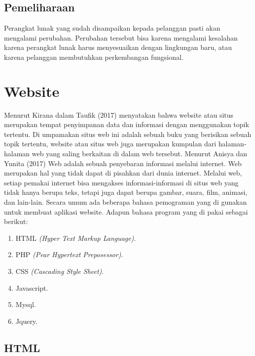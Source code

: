\subsection{ Pemeliharaan}
Perangkat lunak yang sudah disampaikan kepada pelanggan pasti akan mengalami perubahan. Perubahan tersebut bisa karena mengalami kesalahan karena perangkat lunak harus menyesuaikan dengan lingkungan baru, atau karena pelanggan membutuhkan perkembangan fungsional.


\section{Website}
Menurut Kirana dalam Taufik (2017) menyatakan bahwa website atau situs merupakan tempat penyimpanan data dan informasi dengan menggunakan topik tertentu. Di umpamakan situs web ini adalah sebuah buku yang berisikan sebuah topik tertentu, website atau situs web juga merupakan kumpulan dari halaman- halaman web yang saling berkaitan di dalam web tersebut.
Menurut Anisya dan Yunita (2017) Web adalah sebuah penyebaran informasi melalui internet. Web merupakan hal yang tidak dapat di pisahkan dari dunia internet. Melalui web, setiap pemakai internet bisa mengakses informasi-informasi di situs web yang tidak hanya berupa teks, tetapi juga dapat berupa gambar, suara, film, animasi, dan lain-lain.
Secara umum ada beberapa bahasa pemograman yang di gunakan untuk membuat aplikasi website. Adapun bahasa program yang di pakai sebagai berikut:

\begin{enumerate}
	\item HTML \textit{ (Hyper Text Markup Language)}.
	\item PHP \textit{ (Pear Hypertext Preposessor)}.
	\item CSS \textit{ (Cascading Style Sheet)}.
	\item Javascript.
	\item Mysql.
	\item Jquery.

\end{enumerate}

\subsection{HTML}

